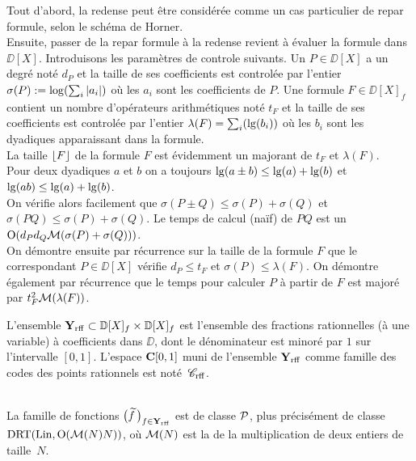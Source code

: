\proof  Tout d'abord, la re\pres dense peut être considérée comme un cas 
particulier de re\pres par formule, selon le schéma de Horner.\\ 
Ensuite, passer de la re\pres par formule à la re\pres dense revient à 
évaluer la formule dans  $\DD[X]$. Introduisons les paramètres de controle 
suivants. Un \pol $P \in \DD[X]$   a un degré noté  $d_P$  et la taille 
de ses coefficients est controlée par l'entier $\sigma(P) := \log(\sum_i \left|{a_i}\right|)$ où les  $a_i$  sont les coefficients de  $P$.  Une formule  $F 
\in \DD[X]_f$  contient un nombre d'opérateurs arithmétiques noté  $t_F$ 
et la taille de ses coefficients est controlée par l'entier $\lambda(F) = 
\sum_i ({\rm lg}(b_i))$   où les  $b_i$ sont les dyadiques apparaissant dans la 
formule.\\  
La taille  $\lfloor F \rfloor$ de la formule $F$ est évidemment un majorant de   
$t_F$ et  $\lambda (F)$.\\
Pour deux dyadiques  $a$  et  $b$  on a toujours  ${\rm lg}(a \pm b) \leq {\rm lg}(a) + 
{\rm lg}(b)$  et $ {\rm lg}(ab) \leq  {\rm lg}(a)+{\rm lg}(b)$.\\
On vérifie alors facilement que $\sigma (P \pm Q) \leq \sigma(P) + \sigma(Q)$   
et  $\sigma (PQ) \leq \sigma (P) + \sigma (Q)$.  Le temps de calcul (naïf) 
de  $PQ$  est un  ${\rm O}(d_Pd_Q {\cal M}(\sigma(P) + \sigma(Q)))$.\\
On démontre ensuite par récurrence sur la taille de la formule $F$ que le 
\pol correspondant  $P \in \DD[X]$  vérifie $d_P \leq t_F$ et  $\sigma 
(P) \leq \lambda (F)$. On démontre également par récurrence que le temps pour 
calculer  $P$  à partir de $F$ est majoré par  $t_F^2{ \cal M}(\lambda(F))$. 
\eop

\begin{fdefinition} \label{f325}
L'ensemble  ${{\bf Y}_{\rm rff}}  \subset \mathbb {D}[X]_f \times \mathbb {D}[X]_f$  est l'ensemble des 
fractions rationnelles (à une variable) à coefficients dans  $\DD$,  dont 
le dénominateur est minoré par  $1$  sur l'intervalle $[0,1]$.  L'espace  
${{\bf C}[0,1]}$  muni de l'ensemble  ${{\bf Y}_{\rm rff}}$  comme famille des codes des points 
rationnels est noté~${{{\mathscr C}}_{\rm rff}}$.
\end{fdefinition} 

\begin {fproposition} \label{f326}
~ \\
La famille de fonctions  $\big(\widetilde{f}\,\big)_{f \in {{\bf Y}_{\rm rff}} }$   est  \uni de classe  
${\cal P}$, plus précisément de classe  
${\rm DRT}({\rm Lin}, {\rm O}({{{\cal M}}}(N)N))$, où ${{\cal M}}(N)$ est la \com de la multiplication de deux entiers de taille~$N$.
\end{fproposition}

